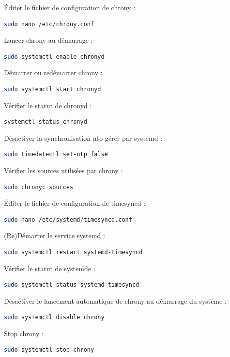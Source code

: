 \documentclass[a4paper]{article}
\begin{document}
\begin{adjustwidth}{-2cm}{-2cm}
\noindent Éditer le fichier de configuration de chrony :
\begin{lstlisting}[language=bash]
  sudo nano /etc/chrony.conf
\end{lstlisting}

\noindent Lancer chrony au démarrage :
\begin{lstlisting}[language=bash]
  sudo systemctl enable chronyd
\end{lstlisting}

\noindent Démarrer ou redémarrer chrony :
\begin{lstlisting}[language=bash]
  sudo systemctl start chronyd
\end{lstlisting}

\noindent Vérifier le statut de chronyd :
\begin{lstlisting}[language=bash]
  systemctl status chronyd
\end{lstlisting}

\noindent Désactiver la synchronisation ntp gérer par systemd :
\begin{lstlisting}[language=bash]
  sudo timedatectl set-ntp false
\end{lstlisting}

\noindent Vérifier les sources utilisées par chrony :
\begin{lstlisting}[language=bash]
  sudo chronyc sources
\end{lstlisting}

\noindent Éditer le fichier de configuration de timesyncd :
\begin{lstlisting}[language=bash]
  sudo nano /etc/systemd/timesyncd.conf
\end{lstlisting}

\noindent (Re)Démarrer le service systemd :
\begin{lstlisting}[language=bash]
  sudo systemctl restart systemd-timesyncd
\end{lstlisting}

\noindent Vérifier le statut de systemde :
\begin{lstlisting}[language=bash]
  sudo systemctl status systemd-timesyncd
\end{lstlisting}

\noindent Désactiver le lancement automatique de chrony au démarrage du système :
\begin{lstlisting}[language=bash]
  sudo systemctl disable chrony
\end{lstlisting}

\noindent Stop chrony :
\begin{lstlisting}[language=bash]
 sudo systemctl stop chrony
\end{lstlisting}


\end{adjustwidth}
\end{document}
